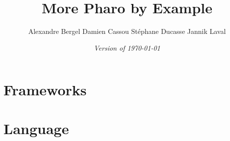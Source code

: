 \documentclass[a4paper,10pt,twoside]{book}
\begin{document}
\frontmatter
\setcounter{page}{1}
\pagestyle{headings}
\author{
	Alexandre Bergel\quad
	Damien Cassou\quad
	St\'ephane Ducasse\quad
	Jannik Laval\quad}
\title{\Huge\bf More Pharo by Example\\[1ex]}
\isodate
\date{\emph{Version of \today}}
\maketitle
\tableofcontents
\sloppy %
\mainmatter

%

% 


\part{Frameworks}












\part{Language}



\end{document}
